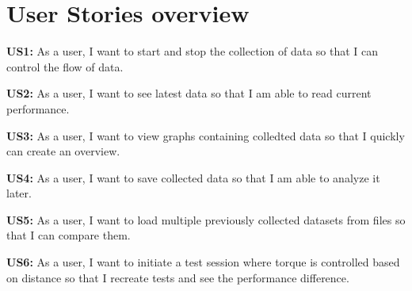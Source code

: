 \section{User Stories overview}

\textbf{US1:} As a user, I want to start and stop the collection of data so that I can control the flow of data.

\textbf{US2:} As a user, I want to see latest data so that I am able to read current performance.

\textbf{US3:} As a user, I want to view graphs containing colledted data so that I quickly can create an overview.

\textbf{US4:} As a user, I want to save collected data so that I am able to analyze it later.

\textbf{US5:} As a user, I want to load multiple previously collected datasets from files so that I can compare them.

\textbf{US6:} As a user, I want to initiate a test session where torque is controlled based on distance so that I recreate tests and see the performance difference.

